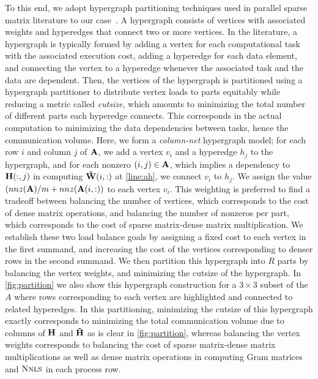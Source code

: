 To this end, we adopt hypergraph partitioning techniques used in parallel sparse matrix literature to our case~\cite{caay:99}.
A hypergraph consists of vertices with associated weights and hyperedges that connect two or more vertices.
In the literature, a hypergraph is typically formed by adding a vertex for each computational task with the associated execution cost, adding a hyperedge for each data element, and connecting the vertex to a hyperedge whenever the associated task and the data are dependent.
Then, the vertices of the hypergraph is partitioned using a hypergraph partitioner to distribute vertex loads to parts equitably while reducing a metric called \emph{cutsize}, which amounts to minimizing the total number of different parts each hyperedge connects.
This corresponds in the actual computation to minimizing the data dependencies between tasks, hence the communication volume.
Here, we form a \emph{column-net} hypergraph model; for each row $i$ and column $j$ of  $\mathbf{A}$, we add a vertex $v_i$ and a hyperedge $h_j$ to the hypergraph, and for each nonzero $(i, j) \in \mathbf{A}$, which implies a dependency to $\mathbf{H}(:, j)$ in computing $\mathbf{\tilde{W}}(i, :)$ at \cref{line:ah}, we connect $v_i$ to $h_j$.
We assign the value $(nnz(\mathbf{A}) / m + nnz(\mathbf{A}(i, :))$ to each vertex $v_i$.
This weighting is preferred to find a tradeoff between balancing the number of vertices, which corresponds to the cost of dense matrix operations, and balancing the number of nonzeros per part, which corresponds to the cost of sparse matrix-dense matrix multiplication.
We establish these two load balance goals by assigning a fixed cost to each vertex in the first summand, and increasing the cost of the vertices corresponding to denser rows in the second summand.
We then partition this hypergraph into $R$ parts by balancing the vertex weights, and minimizing the cutsize of the hypergraph.
In \cref{fig:partition} we also show this hypergraph construction for a $3 \times 3$ subset of the $A$ where rows corresponding to each vertex are highlighted and connected to related hyperedges.
In this partitioning, minimizing the cutsize of this hypergraph exactly corresponds to minimizing the total communication volume due to columns of $\mathbf{H}$ and $\mathbf{\tilde{H}}$ as is clear in \cref{fig:partition}, whereas balancing the vertex weights corresponds to balancing the cost of sparse matrix-dense matrix multiplications as well as dense matrix operations in computing Gram matrices and $\textsc{Nnls}$ in each process row.

